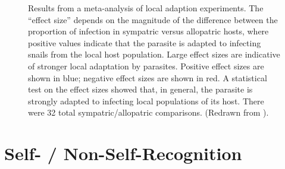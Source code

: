 \documentclass[
  letterpaper,
]{book}
\begin{document}
\begin{figure}


\caption[Results from a meta-analysis of local adaption
experiments]{\label{fig-4.5}Results from a meta-analysis of local
adaption experiments. The ``effect size'' depends on the magnitude of
the difference between the proportion of infection in sympatric versus
allopatric hosts, where positive values indicate that the parasite is
adapted to infecting snails from the local host population. Large effect
sizes are indicative of stronger local adaptation by parasites. Positive
effect sizes are shown in blue; negative effect sizes are shown in red.
A statistical test on the effect sizes showed that, in general, the
parasite is strongly adapted to infecting local populations of its host.
There were 32 total sympatric/allopatric comparisons. (Redrawn from
).}

\end{figure}%

\section{Self- / Non-Self-Recognition}\label{self--non-self-recognition}
\end{document}
